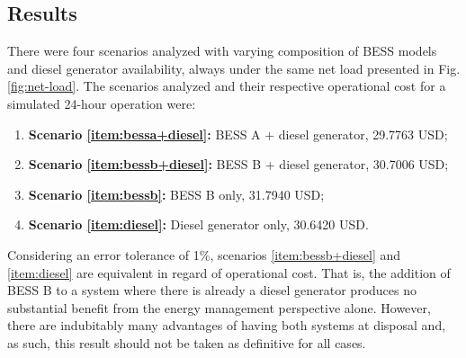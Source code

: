 \documentclass{ieeeaccess}
\begin{document}
    \subsection{Results}
    There were four scenarios analyzed with varying composition of \ac{BESS} models and diesel generator availability, always under the same net load presented in Fig. \ref{fig:net-load}. The scenarios analyzed and their respective operational cost for a simulated 24-hour operation were:
    \begin{enumerate}
        \item \label{item:bessa+diesel} \textbf{Scenario \ref{item:bessa+diesel}:} \ac{BESS} A + diesel generator, 29.7763 USD;
        \item \label{item:bessb+diesel} \textbf{Scenario \ref{item:bessb+diesel}:} \ac{BESS} B + diesel generator, 30.7006 USD;
        \item \label{item:bessb} \textbf{Scenario \ref{item:bessb}:} \ac{BESS} B only, 31.7940 USD;
        \item \label{item:diesel} \textbf{Scenario \ref{item:diesel}:} Diesel generator only, 30.6420 USD.
    \end{enumerate}

    Considering an error tolerance of 1\%, scenarios \ref{item:bessb+diesel} and \ref{item:diesel} are equivalent in regard of operational cost. That is, the addition of \ac{BESS} B to a system where there is already a diesel generator produces no substantial benefit from the energy management perspective alone. However, there are indubitably many advantages of having both systems at disposal and, as such, this result should not be taken as definitive for all cases.
\end{document}
